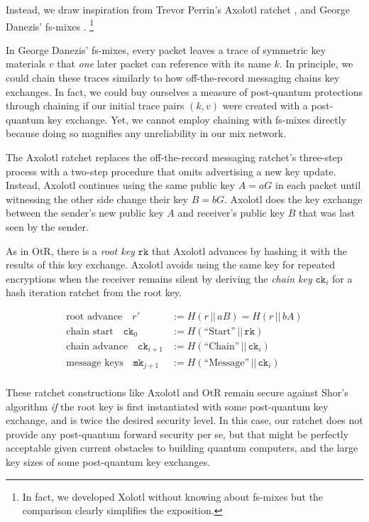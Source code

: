 \documentclass[twoside,letterpaper]{llncs}
\def\mathcomma{}
\begin{document}
Instead, we draw inspiration from Trevor Perrin's Axolotl ratchet
\cite{TextSecure}, and George Danezis' fs-mixes \cite{fs-mix}.
\footnote{In fact, we developed Xolotl without knowing about fs-mixes
but the comparison clearly simplifies the exposition.}


In George Danezis' fs-mixes, every packet leaves a trace of symmetric
key materials $v$ that {\it one} later packet can reference with its
name $k$.  In principle, we could chain these traces similarly to
how off-the-record messaging \cite{OtR} chains key exchanges.
In fact, we could buy ourselves a measure of post-quantum protections
through chaining if our initial trace pairs $(k,v)$ were created with
a post-quantum key exchange.  Yet, we cannot employ chaining with
fs-mixes directly because doing so magnifies any unreliability in
our mix network. 


\def\ck{\texttt{ck}}
\def\rk{\texttt{rk}}
\def\mk{\texttt{mk}}

The Axolotl ratchet \cite{TextSecure} replaces the off-the-record
messaging ratchet's three-step process with a two-step procedure
that omits advertising a new key update.  Instead, Axolotl continues
using the same public key $A = a G$ in each packet until witnessing
the other side change their key $B = b G$.  Axolotl does the key
exchange between the sender's new public key $A$ and receiver's
public key $B$ that was last seen by the sender.

As in OtR, there is a {\it root key} $\rk$ that Axolotl advances by
hashing it with the results of this key exchange.  Axolotl avoids using the same key for
repeated encryptions when the receiver remains silent by deriving the
{\it chain key} $\ck_i$ for a hash iteration ratchet from the root key.

\[ \begin{aligned}
\textrm{root advance}\quad
r' &:= H(r \,||\, a B) = H(r \,||\, b A) \\ %
\textrm{chain start}\quad
 \ck_0 &:= H(\textrm{``Start''} \,||\, \rk) \\
\textrm{chain advance}\quad
 \ck_{i+1} &:= H(\textrm{``Chain''} \,||\, \ck_i)  \\
\textrm{message keys}\quad
 \mk_{j+1} &:= H(\textrm{``Message''} \,||\, \ck_i)  \\
\end{aligned} \]

These ratchet constructions like Axolotl and OtR remain secure against
Shor's algorithm {\it if} the root key is first instantiated with some
post-quantum key exchange, and is twice the desired security level. 
In this case, our ratchet does not provide any post-quantum forward
security per se, but that might be perfectly acceptable given current
obstacles to building quantum computers, and the large key sizes of
some post-quantum key exchanges. 
\end{document}
